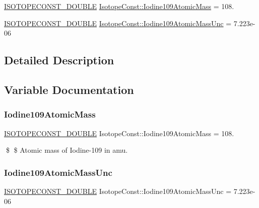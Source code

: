 \begin{DoxyCompactItemize}
\item 
\mbox{\hyperlink{group___isotope_const-_macros_ga8f45a7272ce02c0b4c65c44636ed719a}{I\+S\+O\+T\+O\+P\+E\+C\+O\+N\+S\+T\+\_\+\+D\+O\+U\+B\+LE}} \mbox{\hyperlink{group___isotope_const-_iodine-_i109_ga4ad9bf27c480b13c91ae744a3ccea65b}{Isotope\+Const\+::\+Iodine109\+Atomic\+Mass}} = 108.
\item 
\mbox{\hyperlink{group___isotope_const-_macros_ga8f45a7272ce02c0b4c65c44636ed719a}{I\+S\+O\+T\+O\+P\+E\+C\+O\+N\+S\+T\+\_\+\+D\+O\+U\+B\+LE}} \mbox{\hyperlink{group___isotope_const-_iodine-_i109_gac493e3971bf114589dcd3bfcd0073f5f}{Isotope\+Const\+::\+Iodine109\+Atomic\+Mass\+Unc}} = 7.\+223e-\/06
\end{DoxyCompactItemize}


\subsection{Detailed Description}


\subsection{Variable Documentation}
\mbox{\label{group___isotope_const-_iodine-_i109_ga4ad9bf27c480b13c91ae744a3ccea65b}} 
\subsubsection{\texorpdfstring{Iodine109\+Atomic\+Mass}{Iodine109AtomicMass}}
{\footnotesize\ttfamily \mbox{\hyperlink{group___isotope_const-_macros_ga8f45a7272ce02c0b4c65c44636ed719a}{I\+S\+O\+T\+O\+P\+E\+C\+O\+N\+S\+T\+\_\+\+D\+O\+U\+B\+LE}} Isotope\+Const\+::\+Iodine109\+Atomic\+Mass = 108.}

\$ \$ Atomic mass of Iodine-\/109 in amu. \mbox{\label{group___isotope_const-_iodine-_i109_gac493e3971bf114589dcd3bfcd0073f5f}} 
\subsubsection{\texorpdfstring{Iodine109\+Atomic\+Mass\+Unc}{Iodine109AtomicMassUnc}}
{\footnotesize\ttfamily \mbox{\hyperlink{group___isotope_const-_macros_ga8f45a7272ce02c0b4c65c44636ed719a}{I\+S\+O\+T\+O\+P\+E\+C\+O\+N\+S\+T\+\_\+\+D\+O\+U\+B\+LE}} Isotope\+Const\+::\+Iodine109\+Atomic\+Mass\+Unc = 7.\+223e-\/06}

